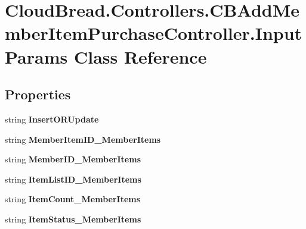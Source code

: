 \hypertarget{a00124}{}\section{Cloud\+Bread.\+Controllers.\+C\+B\+Add\+Member\+Item\+Purchase\+Controller.\+Input\+Params Class Reference}
\label{a00124}
\subsection*{Properties}
\begin{DoxyCompactItemize}
\item 
string {\bfseries Insert\+O\+R\+Update}\hypertarget{a00124_af795b4a9b699f5a29b0de3e83c39eeca}{}\label{a00124_af795b4a9b699f5a29b0de3e83c39eeca}

\item 
string {\bfseries Member\+Item\+I\+D\+\_\+\+Member\+Items}\hypertarget{a00124_a681419987579e91b71a580f8166fde9f}{}\label{a00124_a681419987579e91b71a580f8166fde9f}

\item 
string {\bfseries Member\+I\+D\+\_\+\+Member\+Items}\hypertarget{a00124_af1fad442c4b847953a1d47343164fd0c}{}\label{a00124_af1fad442c4b847953a1d47343164fd0c}

\item 
string {\bfseries Item\+List\+I\+D\+\_\+\+Member\+Items}\hypertarget{a00124_ab5b37306d113427dfdd4074ccb3b189d}{}\label{a00124_ab5b37306d113427dfdd4074ccb3b189d}

\item 
string {\bfseries Item\+Count\+\_\+\+Member\+Items}\hypertarget{a00124_acedee7d8e1f6433f682c6a043ac041cf}{}\label{a00124_acedee7d8e1f6433f682c6a043ac041cf}

\item 
string {\bfseries Item\+Status\+\_\+\+Member\+Items}\hypertarget{a00124_a2aff7d5dfedff73f67106dfc7a3578f7}{}\label{a00124_a2aff7d5dfedff73f67106dfc7a3578f7}


\end{DoxyCompactItemize}
